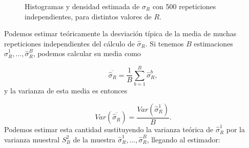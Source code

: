 \documentclass[12pt]{article}
\begin{document}
\begin{figure}[h!]
\vspace{-4.5em}
  \caption{Histogramas y densidad estimada de $\hat\sigma_R$ con 500 repeticiones independientes, para distintos valores de $R$.}
\end{figure}

Podemos estimar teóricamente la desviación típica de la media de muchas repeticiones independientes del cálculo de $\hat\sigma_R$. Si tenemos $B$ estimaciones $\hat\sigma_R^{1}, \dots, \hat\sigma_R^{B}$, podemos calcular su media como

\[
\overline{\hat\sigma_R} = \frac{1}{B}\sum_{b=1}^B \hat\sigma_R^{b},
\]
y la varianza de esta media es entonces

\[
Var(\overline{\hat\sigma_R}) = \frac{Var(\hat\sigma_R^1)}{B}.
\]
Podemos estimar esta cantidad sustituyendo la varianza teórica de $\hat\sigma_R^1$ por la varianza muestral $S^2_B$ de la muestra $\hat\sigma_R^{1}, \dots, \hat\sigma_R^{B}$, llegando al estimador:
\end{document}
